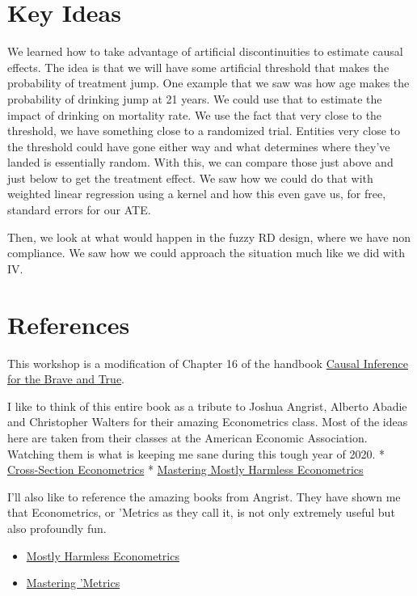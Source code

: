\documentclass[
  letterpaper,
  DIV=11,
  numbers=noendperiod]{scrreprt}
\providecommand{\tightlist}{%
  \setlength{\itemsep}{0pt}\setlength{\parskip}{0pt}}\usepackage{longtable,booktabs,array}
\begin{document}
\hypertarget{key-ideas}{%
\section{Key Ideas}\label{key-ideas}}

We learned how to take advantage of artificial discontinuities to
estimate causal effects. The idea is that we will have some artificial
threshold that makes the probability of treatment jump. One example that
we saw was how age makes the probability of drinking jump at 21 years.
We could use that to estimate the impact of drinking on mortality rate.
We use the fact that very close to the threshold, we have something
close to a randomized trial. Entities very close to the threshold could
have gone either way and what determines where they've landed is
essentially random. With this, we can compare those just above and just
below to get the treatment effect. We saw how we could do that with
weighted linear regression using a kernel and how this even gave us, for
free, standard errors for our ATE.

Then, we look at what would happen in the fuzzy RD design, where we have
non compliance. We saw how we could approach the situation much like we
did with IV.

\hypertarget{references}{%
\section{References}\label{references}}

This workshop is a modification of Chapter 16 of the handbook
\href{https://github.com/matheusfacure/python-causality-handbook}{Causal
Inference for the Brave and True}.

I like to think of this entire book as a tribute to Joshua Angrist,
Alberto Abadie and Christopher Walters for their amazing Econometrics
class. Most of the ideas here are taken from their classes at the
American Economic Association. Watching them is what is keeping me sane
during this tough year of 2020. *
\href{https://www.aeaweb.org/conference/cont-ed/2017-webcasts}{Cross-Section
Econometrics} *
\href{https://www.aeaweb.org/conference/cont-ed/2020-webcasts}{Mastering
Mostly Harmless Econometrics}

I'll also like to reference the amazing books from Angrist. They have
shown me that Econometrics, or 'Metrics as they call it, is not only
extremely useful but also profoundly fun.

\begin{itemize}
\tightlist
\item
  \href{https://www.mostlyharmlesseconometrics.com/}{Mostly Harmless
  Econometrics}
\item
  \href{https://www.masteringmetrics.com/}{Mastering 'Metrics}
\end{itemize}
\end{document}
